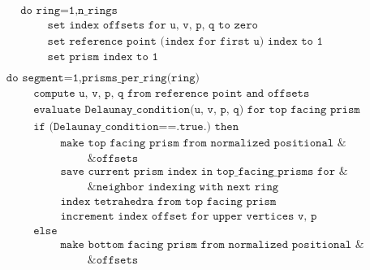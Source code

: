 \documentclass[./main.tex]{subfiles}
\begin{document}
\begin{align*}
&\texttt{do ring=1,n\_rings}\nonumber\\
&\hspace{1cm} \texttt{set index offsets for u, v, p, q to zero}\nonumber\\
&\hspace{1cm} \texttt{set reference point (index for first u) index to 1}\nonumber\\
&\hspace{1cm} \texttt{set prism index to 1}\nonumber\\
\end{align*}
\begin{align*}
&\hspace{1cm} \texttt{do segment=1,prisms\_per\_ring(ring)}\nonumber\\
&\hspace{2cm} \texttt{compute u, v, p, q from reference point and offsets}\nonumber\\
&\hspace{2cm} \texttt{evaluate Delaunay\_condition(u, v, p, q) for top facing prism}\nonumber\\
&\hspace{2cm} \texttt{if (Delaunay\_condition==.true.) then}\nonumber\\
&\hspace{3cm} \texttt{make top facing prism from normalized positional \&}\nonumber\\
&\hspace{4cm} \texttt{\& offsets}\nonumber\\
&\hspace{3cm} \texttt{save current prism index in top\_facing\_prisms for \&}\nonumber\\
&\hspace{4cm} \texttt{\& neighbor indexing with next ring}\nonumber\\
&\hspace{3cm} \texttt{index tetrahedra from top facing prism}\nonumber\\
&\hspace{3cm} \texttt{increment index offset for upper vertices v, p}\nonumber\\
&\hspace{2cm} \texttt{else}\nonumber\\
&\hspace{3cm} \texttt{make bottom facing prism from normalized positional \&}\nonumber\\
&\hspace{4cm} \texttt{\& offsets}\nonumber\\

\end{align*}
\end{document}
